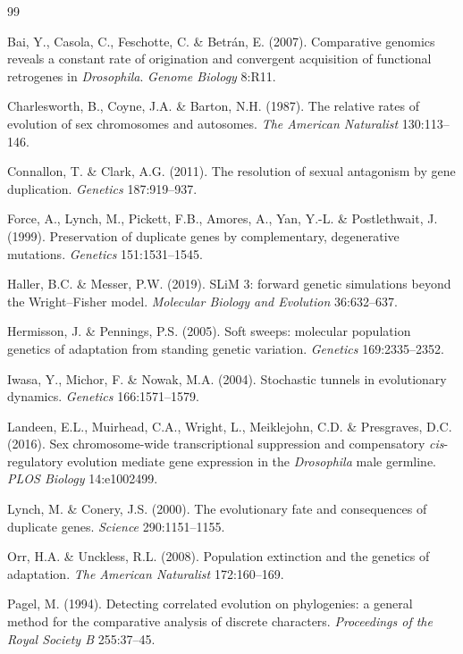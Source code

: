 \documentclass[11pt,a4paper]{article}
\begin{document}
\begin{thebibliography}{99}

 Bai, Y., Casola, C., Feschotte, C. \& Betr\'an, E. (2007). Comparative genomics reveals a constant rate of origination and convergent acquisition of functional retrogenes in \emph{Drosophila}. \emph{Genome Biology} 8:R11.

 Charlesworth, B., Coyne, J.A. \& Barton, N.H. (1987). The relative rates of evolution of sex chromosomes and autosomes. \emph{The American Naturalist} 130:113--146.

 Connallon, T. \& Clark, A.G. (2011). The resolution of sexual antagonism by gene duplication. \emph{Genetics} 187:919--937.

 Force, A., Lynch, M., Pickett, F.B., Amores, A., Yan, Y.-L. \& Postlethwait, J. (1999). Preservation of duplicate genes by complementary, degenerative mutations. \emph{Genetics} 151:1531--1545.

 Haller, B.C. \& Messer, P.W. (2019). SLiM 3: forward genetic simulations beyond the Wright--Fisher model. \emph{Molecular Biology and Evolution} 36:632--637.

 Hermisson, J. \& Pennings, P.S. (2005). Soft sweeps: molecular population genetics of adaptation from standing genetic variation. \emph{Genetics} 169:2335--2352.

 Iwasa, Y., Michor, F. \& Nowak, M.A. (2004). Stochastic tunnels in evolutionary dynamics. \emph{Genetics} 166:1571--1579.

 Landeen, E.L., Muirhead, C.A., Wright, L., Meiklejohn, C.D. \& Presgraves, D.C. (2016). Sex chromosome-wide transcriptional suppression and compensatory \emph{cis}-regulatory evolution mediate gene expression in the \emph{Drosophila} male germline. \emph{PLOS Biology} 14:e1002499.

 Lynch, M. \& Conery, J.S. (2000). The evolutionary fate and consequences of duplicate genes. \emph{Science} 290:1151--1155.

 Orr, H.A. \& Unckless, R.L. (2008). Population extinction and the genetics of adaptation. \emph{The American Naturalist} 172:160--169.

 Pagel, M. (1994). Detecting correlated evolution on phylogenies: a general method for the comparative analysis of discrete characters. \emph{Proceedings of the Royal Society B} 255:37--45.


\end{thebibliography}
\end{document}
